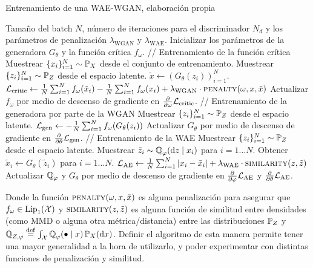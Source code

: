 \begin{algorithm}[H]

    \caption{Entrenamiento de una WAE-WGAN, elaboración propia}\label{alg:WAE-WGAN}
    \begin{algorithmic}[1]
        \Require Tamaño del batch $N$, número de iteraciones para el discriminador $N_d$ y los parámetros de penalización $\lambda_{\mathrm{WGAN}}$ y $\lambda_{\mathrm{WAE}}$.
        \State Inicializar los parámetros de la generadora $G_\theta$ y la función crítica $f_\omega$.
        \State // {Entrenamiento de la función crítica}
        \State Muestrear $\{x_i\}_{i=1}^{N} \sim \Prob_X$ desde el conjunto de entrenamiento.
        \State Muestrear $\{z_i\}_{i=1}^{N} \sim \Prob_Z$ desde el espacio latente.
        \State $\tilde x \gets (G_\theta(z_i))_{i=1}^{N}$.
        \State $\cL_{\mathrm{critic}} \gets
            \frac{1}{N} \sum_{i=1}^{N} f_{\omega}(\tilde x_i) - \frac{1}{N} \sum_{i=1}^{N} f_{\omega}(x_i) + \lambda_{\mathrm{WGAN}} \cdot \Call{penalty}{\omega, x, \tilde x}$
        \State Actualizar $f_{\omega}$ por medio de descenso de gradiente en $\pdv{\omega} \mathcal{L}_{\mathrm{critic}}$.
        \EndFor
        \State // {Entrenamiento de la generadora por parte de la WGAN}
        \State Muestrear $\{z_i\}_{i=1}^{N} \sim \Prob_Z$ desde el espacio latente.
        \State $\mathcal{L}_{\mathrm{gen}} \gets - \frac{1}{N}\sum_{i=1}^{N} f_\omega(G_\theta(z_i))$
        \State Actualizar $G_\theta$ por medio de descenso de gradiente en $\pdv{\theta} \mathcal{L}_{\mathrm{gen}}$.
        \State // {Entrenamiento de la WAE}
        \State Muestrear $\{z_i\}_{i=1}^{N} \sim \Prob_Z$ desde el espacio latente.
        \State Muestrear $\tilde z_i \sim \ProbQ_\varphi(\dd z \mid x_i)$ para $i=1\dots N$.
        \State Obtener $\tilde x_i \gets G_\theta(\tilde z_i)$ para $i=1\dots N$.
        \State $\cL_{\mathrm{AE}} \gets \frac{1}{N}\sum_{i=1}^{N} |x_i - \tilde x_i| + \lambda_{\mathrm{WAE}} \cdot \Call{similarity}{z, \tilde z}$
        \State Actualizar $\ProbQ_\varphi$ y $G_\theta$ por medio de descenso de gradiente en $\pdv{\varphi} \cL_{\mathrm{AE}}$ y $\pdv{\theta} \mathcal{L}_{\mathrm{AE}}$.
        \EndWhile
    \end{algorithmic}
\end{algorithm}

Donde la función $\Call{penalty}{\omega, x, \tilde x}$ es alguna penalización para asegurar que $f_\omega\in \Lip_1(\cX)$ y $\Call{similarity}{z, \tilde z}$ es alguna función de similitud entre densidades (como MMD o alguna otra métrica/distancia) entre las distribuciones $\Prob_Z$ y $\ProbQ_{Z, \varphi} \eqdef \int_{\cX} \ProbQ_\varphi(\bullet \mid x) \Prob_X(\dx)$. Definir el algoritmo de esta manera permite tener una mayor generalidad a la hora de utilizarlo, y poder experimentar con distintas funciones de penalización y similitud.

